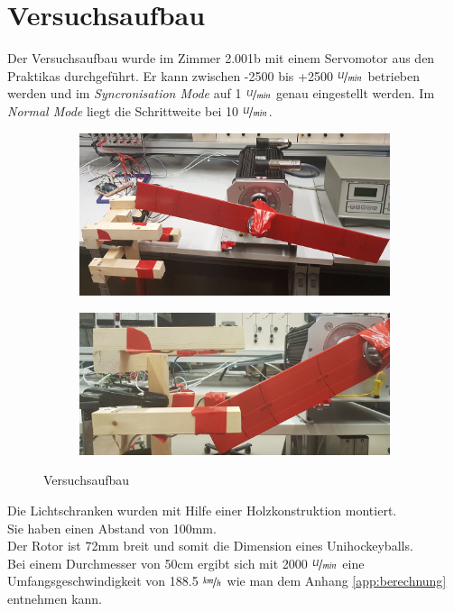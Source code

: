 \section{Versuchsaufbau}
Der Versuchsaufbau wurde im Zimmer 2.001b mit einem Servomotor aus den Praktikas durchgeführt. Er kann zwischen -2500 bis +2500 $\nicefrac{U}{min}$ betrieben werden und im \textit{Syncronisation Mode} auf 1 $\nicefrac{U}{min}$ genau eingestellt werden. Im \textit{Normal Mode} liegt die Schrittweite bei 10 $\nicefrac{U}{min}$.

\begin{figure}[ht]
    \centering
    \begin{subfigure}[c]{0.8\textwidth}       
        \includegraphics[width=\textwidth]{images/Aufbau.jpg}
    \end{subfigure}

    \begin{subfigure}[c]{0.8\textwidth}
        \includegraphics[width=\textwidth]{images/AufbauDetail.jpg}
    \end{subfigure}
    \caption{Versuchsaufbau}\label{fig:Aufbau}   
\end{figure}

Die Lichtschranken wurden mit Hilfe einer Holzkonstruktion montiert.\\
Sie haben einen Abstand von 100mm.\\
Der  Rotor ist 72mm breit und somit die Dimension eines Unihockeyballs.\\

Bei einem Durchmesser von 50cm ergibt sich mit 2000 $\nicefrac{U}{min}$ eine Umfangsgeschwindigkeit von 188.5 $\nicefrac{km}{h}$ wie man dem Anhang \ref{app:berechnung} entnehmen kann.